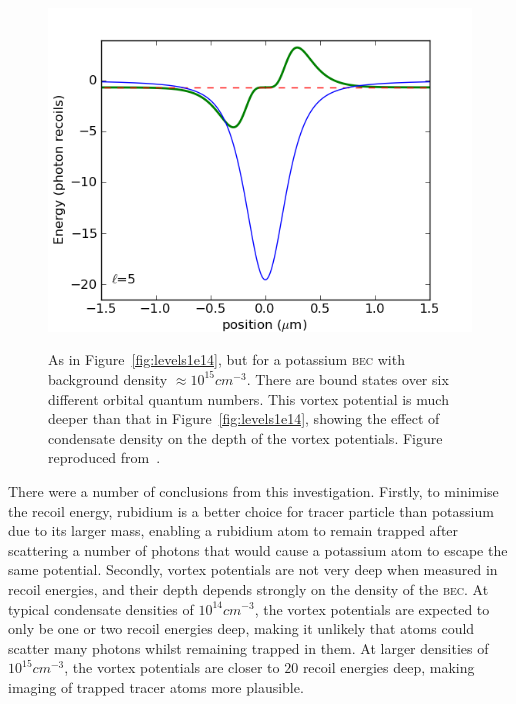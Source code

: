 \begin{figure}
{\includegraphics[width=0.5\columnwidth]{figures/velocimetry/levels1e15_l=05}}
\noindent{}
\caption{As in Figure~\ref{fig:levels1e14}, but for a potassium \textsc{bec} with background density ${\approx 10^{15}\unit{cm}^{-3}}$. There are bound states over six different orbital quantum numbers. This vortex potential is much deeper than that in Figure~\ref{fig:levels1e14}, showing the effect of condensate density on the depth of the vortex potentials. Figure reproduced from~\cite{billington_particle_2010}.}%
\label{fig:levels1e15}%
\end{figure}

There were a number of conclusions from this investigation. Firstly, to minimise the recoil energy, rubidium is a better choice for tracer particle than potassium due to its larger mass, enabling a rubidium atom to remain trapped after scattering a number of photons that would cause a potassium atom to escape the same potential. Secondly, vortex potentials are not very deep when measured in recoil energies, and their depth depends strongly on the density of the \textsc{bec}. At typical condensate densities of $10^{14}\unit{cm}^{-3}$, the vortex potentials are expected to only be one or two recoil energies deep, making it unlikely that atoms could scatter many photons whilst remaining trapped in them. At larger densities of $10^{15}\unit{cm}^{-3}$, the vortex potentials are closer to $20$ recoil energies deep, making imaging of trapped tracer atoms more plausible.

